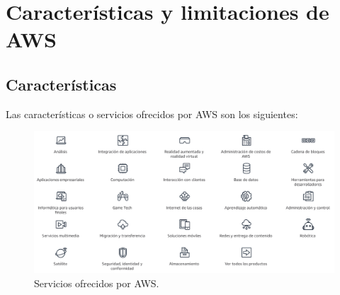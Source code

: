\chapter{Características y limitaciones de AWS}
\section{Características}
Las características o servicios ofrecidos por AWS son los siguientes:
\begin{figure}[h]
	\centering
	\includegraphics[scale=0.4]{ImagenesAWS/Servicios.png}
	\caption{Servicios ofrecidos por AWS.}
	\label{Servicios ofrecidos por AWS}
\end{figure}

